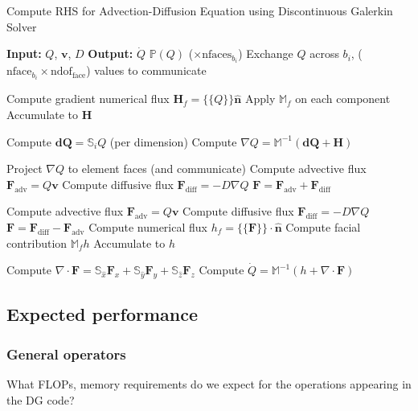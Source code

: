 \documentclass[11pt]{article}
\renewcommand{\vec}[1]{\bm{#1}}
\begin{document}
\begin{algorithm}
\caption{Compute RHS for Advection-Diffusion Equation using Discontinuous Galerkin Solver}
\begin{algorithmic}[1]
\State \textbf{Input:} $Q$, $\vec{v}$, $D$
\State \textbf{Output:} $\dot{Q}$
\State $\mathbb{P}(Q)$ ($\times \text{nfaces}_{b_i}$)
\State Exchange $Q$ across $b_i$, ($\text{nface}_{b_i} \times \text{ndof}_\text{face}$) values to communicate
\EndIf
\EndFor

  \State Compute gradient numerical flux $\mathbf{H}_f = \{\{Q\}\}\hat{\mathbf{n}}$
  \State Apply $\mathbb{M}_f$ on each component
  \State Accumulate to $\mathbf{H}$
\EndFor

\State Compute $\vec{dQ} = \mathbb{S}_i Q$ (per dimension)
\State Compute $\nabla{Q} = \mathbb{M}^{-1}(\vec{dQ} + \mathbf{H})$

\State Project $\nabla{Q}$ to element faces (and communicate)
\State Compute advective flux $\mathbf{F}_\text{adv} = Q\vec{v}$
\State Compute diffusive flux $\mathbf{F}_\text{diff} = -D\nabla{Q}$
\State $\mathbf{F} = \mathbf{F}_\text{adv} + \mathbf{F}_\text{diff}$

  \State Compute advective flux $\mathbf{F}_\text{adv} = Q\vec{v}$
  \State Compute diffusive flux $\mathbf{F}_\text{diff} = -D\nabla{Q}$
  \State $\mathbf{F} = \mathbf{F}_\text{diff} - \mathbf{F}_\text{adv}$
  \State Compute numerical flux $h_f=\{\{\mathbf{F}\}\} \cdot \hat{\mathbf{n}}$
  \State Compute facial contribution $\mathbb{M}_f h$
  \State Accumulate to $h$
\EndFor

\State Compute $\nabla \cdot \mathbf{F} = \mathbb{S}_{\hat{x}}\mathbf{F}_x + \mathbb{S}_{\hat{y}}\mathbf{F}_y + \mathbb{S}_{\hat{z}}\mathbf{F}_z$
\State Compute $\dot{Q} = \mathbb{M}^{-1}(h + \nabla \cdot \mathbf{F})$
\end{algorithmic}
\end{algorithm}

\subsection{Expected performance}
\subsubsection{General operators}
What FLOPs, memory requirements do we expect for the operations appearing in the DG code?
\end{document}
